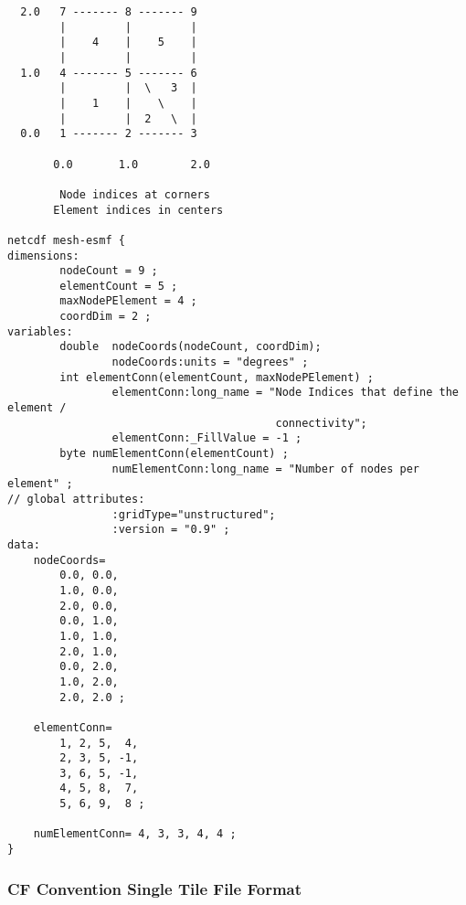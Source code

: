 \begin{verbatim}
  2.0   7 ------- 8 ------- 9
        |         |         |
        |    4    |    5    |
        |         |         |
  1.0   4 ------- 5 ------- 6
        |         |  \   3  |
        |    1    |    \    |
        |         |  2   \  |
  0.0   1 ------- 2 ------- 3

       0.0       1.0        2.0

        Node indices at corners
       Element indices in centers

netcdf mesh-esmf {
dimensions:
        nodeCount = 9 ;
        elementCount = 5 ;
        maxNodePElement = 4 ;
        coordDim = 2 ;
variables:
        double  nodeCoords(nodeCount, coordDim);
                nodeCoords:units = "degrees" ;
        int elementConn(elementCount, maxNodePElement) ;
                elementConn:long_name = "Node Indices that define the element /
                                         connectivity";
                elementConn:_FillValue = -1 ;
        byte numElementConn(elementCount) ;
                numElementConn:long_name = "Number of nodes per element" ;
// global attributes:
                :gridType="unstructured";
                :version = "0.9" ;
data:
    nodeCoords=
        0.0, 0.0,
        1.0, 0.0,
        2.0, 0.0,
        0.0, 1.0,
        1.0, 1.0,
        2.0, 1.0,
        0.0, 2.0,
        1.0, 2.0,
        2.0, 2.0 ;

    elementConn=
        1, 2, 5,  4,
        2, 3, 5, -1,
        3, 6, 5, -1,
        4, 5, 8,  7,
        5, 6, 9,  8 ;

    numElementConn= 4, 3, 3, 4, 4 ;
}

\end{verbatim}

\subsubsection{CF Convention Single Tile File Format}\label{sec:fileformat:gridspec}

